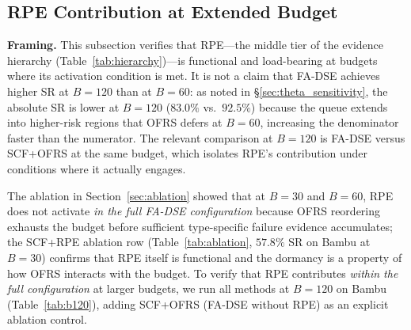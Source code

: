 \documentclass[journal]{IEEEtran}
\begin{document}

\subsection{RPE Contribution at Extended Budget}
\label{sec:b120}

\textbf{Framing.} This subsection verifies that RPE---the middle tier of the evidence hierarchy (Table~\ref{tab:hierarchy})---is functional and load-bearing at budgets where its activation condition is met. It is not a claim that FA-DSE achieves higher SR at $B{=}120$ than at $B{=}60$: as noted in \S\ref{sec:theta_sensitivity}, the absolute SR is lower at $B{=}120$ ($83.0\%$ vs.\ $92.5\%$) because the queue extends into higher-risk regions that OFRS defers at $B{=}60$, increasing the denominator faster than the numerator. The relevant comparison at $B{=}120$ is FA-DSE versus SCF+OFRS at the same budget, which isolates RPE's contribution under conditions where it actually engages.

The ablation in Section~\ref{sec:ablation} showed that at $B{=}30$ and $B{=}60$, RPE does not activate \emph{in the full FA-DSE configuration} because OFRS reordering exhausts the budget before sufficient type-specific failure evidence accumulates; the SCF+RPE ablation row (Table~\ref{tab:ablation}, $57.8\%$ SR on Bambu at $B{=}30$) confirms that RPE itself is functional and the dormancy is a property of how OFRS interacts with the budget. To verify that RPE contributes \emph{within the full configuration} at larger budgets, we run all methods at $B{=}120$ on Bambu (Table~\ref{tab:b120}), adding SCF+OFRS (FA-DSE without RPE) as an explicit ablation control.
\end{document}
